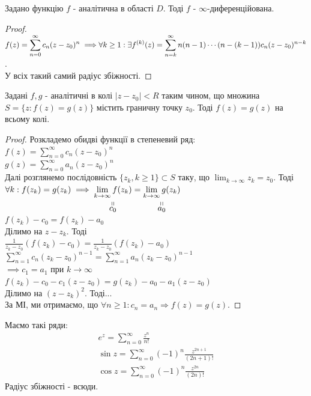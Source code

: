 \documentclass{math_library}
\begin{document}
\begin{proposition}
Задано функцію $f$ - аналітична в області $D$. Тоді $f$ - $\infty$-диференційована.
\end{proposition}

\begin{proof}
$\displaystyle f(z)=\sum_{n=0}^{\infty} c_n(z-z_0)^n \implies \\ \forall k\geq1: \exists f^{(k)}(z) = \sum_{n=k}^{\infty} n(n-1) \cdots (n-(k-1))c_n(z-z_0)^{n-k}$. \\
У всіх такий самий радіус збіжності.
\end{proof}

\begin{theorem}
Задані $f,g$ - аналітичні в колі $|z-z_0|<R$ таким чином, що множина $S=\{z: f(z)=g(z)\}$ містить граничну точку $z_0$. Тоді $f(z)=g(z)$ на всьому колі.
\end{theorem}

\begin{proof}
Розкладемо обидві функції в степеневий ряд:\\
	$\displaystyle f(z)=\sum_{n=0}^{\infty} c_n(z-z_0)^n$\\
	$\displaystyle g(z)=\sum_{n=0}^{\infty} a_n(z-z_0)^n$\\
	Далі розглянемо послідовність $\{z_k, k\geq 1\} \subset S$ таку, що $\displaystyle\lim_{k\to\infty} z_k = z_0$. Тоді $\forall k: f(z_k)=g(z_k) \implies \stackbelow{\displaystyle\lim_{k\to\infty} f(z_k)}{c_0} = \stackbelow{\displaystyle\lim_{k\to\infty} g(z_k)}{a_0}$\\
	$f(z_k)-c_0=f(z_k)-a_0$\\
	Ділимо на $z-z_k$. Тоді\\
	$\displaystyle \frac{1}{z_k-z_0}(f(z_k)-c_0) = \frac{1}{z_k-z_0}(f(z_k)-a_0)$\\
	$\displaystyle \sum_{n=1}^{\infty} c_n(z_k-z_0)^{n-1} = \sum_{n=1}^{\infty} a_n(z_k-z_0)^{n-1}$\\
	$\implies c_1 = a_1$ при $k\to\infty$\\
	$f(z_k)-c_0-c_1(z-z_0) = g(z_k)-a_0-a_1(z-z_0)$\\
	Ділимо на $(z-z_k)^2$. Тоді...\\
	За МІ, ми отримаємо, що $\forall n \geq 1: c_n = a_n \Rightarrow f(z)=g(z)$.
\end{proof}

\begin{corollary}
Маємо такі ряди:
\begin{align*}
e^z = \sum_{n=0}^{\infty} \frac{z^n}{n!}\\
\sin z = \sum_{n=0}^{\infty} (-1)^n \frac{z^{2n+1}}{(2n+1)!}\\
\cos z = \sum_{n=0}^{\infty} (-1)^n \frac{z^{2n}}{(2n)!}
\end{align*}
Радіус збіжності - всюди.
\end{corollary}
\end{document}

